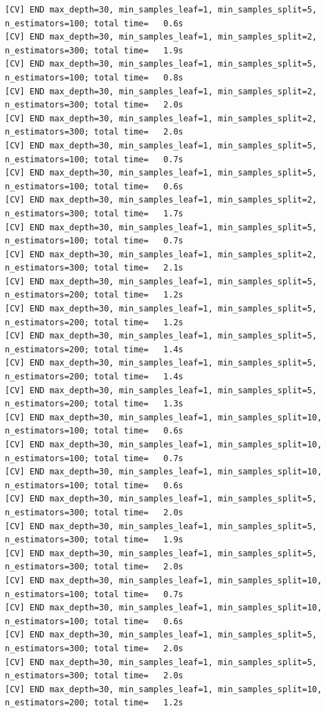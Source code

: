 \documentclass[
  11pt,
  letterpaper,
  DIV=11,
  numbers=noendperiod]{scrartcl}
\begin{document}
\begin{verbatim}
[CV] END max_depth=30, min_samples_leaf=1, min_samples_split=5, n_estimators=100; total time=   0.6s
[CV] END max_depth=30, min_samples_leaf=1, min_samples_split=2, n_estimators=300; total time=   1.9s
[CV] END max_depth=30, min_samples_leaf=1, min_samples_split=5, n_estimators=100; total time=   0.8s
[CV] END max_depth=30, min_samples_leaf=1, min_samples_split=2, n_estimators=300; total time=   2.0s
[CV] END max_depth=30, min_samples_leaf=1, min_samples_split=2, n_estimators=300; total time=   2.0s
[CV] END max_depth=30, min_samples_leaf=1, min_samples_split=5, n_estimators=100; total time=   0.7s
[CV] END max_depth=30, min_samples_leaf=1, min_samples_split=5, n_estimators=100; total time=   0.6s
[CV] END max_depth=30, min_samples_leaf=1, min_samples_split=2, n_estimators=300; total time=   1.7s
[CV] END max_depth=30, min_samples_leaf=1, min_samples_split=5, n_estimators=100; total time=   0.7s
[CV] END max_depth=30, min_samples_leaf=1, min_samples_split=2, n_estimators=300; total time=   2.1s
[CV] END max_depth=30, min_samples_leaf=1, min_samples_split=5, n_estimators=200; total time=   1.2s
[CV] END max_depth=30, min_samples_leaf=1, min_samples_split=5, n_estimators=200; total time=   1.2s
[CV] END max_depth=30, min_samples_leaf=1, min_samples_split=5, n_estimators=200; total time=   1.4s
[CV] END max_depth=30, min_samples_leaf=1, min_samples_split=5, n_estimators=200; total time=   1.4s
[CV] END max_depth=30, min_samples_leaf=1, min_samples_split=5, n_estimators=200; total time=   1.3s
[CV] END max_depth=30, min_samples_leaf=1, min_samples_split=10, n_estimators=100; total time=   0.6s
[CV] END max_depth=30, min_samples_leaf=1, min_samples_split=10, n_estimators=100; total time=   0.7s
[CV] END max_depth=30, min_samples_leaf=1, min_samples_split=10, n_estimators=100; total time=   0.6s
[CV] END max_depth=30, min_samples_leaf=1, min_samples_split=5, n_estimators=300; total time=   2.0s
[CV] END max_depth=30, min_samples_leaf=1, min_samples_split=5, n_estimators=300; total time=   1.9s
[CV] END max_depth=30, min_samples_leaf=1, min_samples_split=5, n_estimators=300; total time=   2.0s
[CV] END max_depth=30, min_samples_leaf=1, min_samples_split=10, n_estimators=100; total time=   0.7s
[CV] END max_depth=30, min_samples_leaf=1, min_samples_split=10, n_estimators=100; total time=   0.6s
[CV] END max_depth=30, min_samples_leaf=1, min_samples_split=5, n_estimators=300; total time=   2.0s
[CV] END max_depth=30, min_samples_leaf=1, min_samples_split=5, n_estimators=300; total time=   2.0s
[CV] END max_depth=30, min_samples_leaf=1, min_samples_split=10, n_estimators=200; total time=   1.2s

\end{verbatim}
\end{document}

